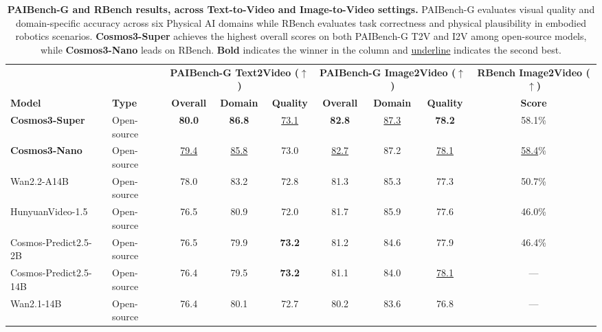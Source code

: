 \begin{table}[t]
    \centering
    \captionsetup{justification=raggedright, singlelinecheck=false}
    \caption{\textbf{PAIBench-G and RBench results, across Text-to-Video and Image-to-Video settings.} PAIBench-G evaluates visual quality and domain-specific accuracy across six Physical AI domains while RBench evaluates task correctness and physical plausibility in embodied robotics scenarios. \textbf{Cosmos3-Super} achieves the highest overall scores on both PAIBench-G T2V and I2V among open-source models, while \textbf{Cosmos3-Nano} leads on RBench. \textbf{Bold} indicates the winner in the column and \underline{underline} indicates the second best.}
    \label{tab:paibench_rbench_results_combined}
    \footnotesize
    \setlength{\tabcolsep}{4pt}
    \renewcommand{\arraystretch}{1.15}
    \begin{tabular}{l l | ccc | ccc | c}
        \toprule
        & & \multicolumn{3}{c}{\textbf{PAIBench-G Text2Video ($\uparrow$)}} & \multicolumn{3}{c}{\textbf{PAIBench-G Image2Video ($\uparrow$)}} & \textbf{RBench Image2Video ($\uparrow$)} \\
        \cmidrule(lr){3-5} \cmidrule(lr){6-8} \cmidrule{9-9}
        \textbf{Model} & \textbf{Type} & \textbf{Overall} & \textbf{Domain} & \textbf{Quality} & \textbf{Overall} & \textbf{Domain} & \textbf{Quality} & \textbf{Score} \\
        \midrule
        \rowcolor{rowours}
        \textbf{Cosmos3-Super} & Open-source & \textbf{80.0} & \textbf{86.8} & \underline{73.1} & \textbf{82.8} & \underline{87.3} & \textbf{78.2} & 58.1\% \\
        \rowcolor{rowours}
        \textbf{Cosmos3-Nano}  & Open-source & \underline{79.4} & \underline{85.8} & 73.0 & \underline{82.7} & 87.2 & \underline{78.1} & \underline{58.4}\% \\
        \midrule
        Wan2.2-A14B                   & Open-source & 78.0 & 83.2 & 72.8 & 81.3 & 85.3 & 77.3 & 50.7\% \\
        HunyuanVideo-1.5              & Open-source & 76.5 & 80.9 & 72.0 & 81.7 & 85.9 & 77.6 & 46.0\% \\
        Cosmos-Predict2.5-2B   & Open-source & 76.5 & 79.9 & \textbf{73.2} & 81.2 & 84.6 & 77.9 & 46.4\% \\
        Cosmos-Predict2.5-14B  & Open-source & 76.4 & 79.5 & \textbf{73.2} & 81.1 & 84.0 & \underline{78.1} & ---  \\
        Wan2.1-14B                    & Open-source & 76.4 & 80.1 & 72.7 & 80.2 & 83.6 & 76.8 & ---  \\

\end{tabular}
\end{table}
